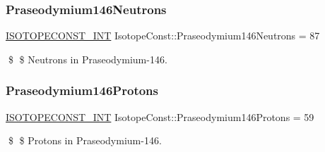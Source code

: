 \subsubsection{\texorpdfstring{Praseodymium146\+Neutrons}{Praseodymium146Neutrons}}
{\footnotesize\ttfamily \mbox{\hyperlink{group___isotope_const-_macros_ga5f18360b3e99483a35c32d789e62621c}{I\+S\+O\+T\+O\+P\+E\+C\+O\+N\+S\+T\+\_\+\+I\+NT}} Isotope\+Const\+::\+Praseodymium146\+Neutrons = 87}

\$ \$ Neutrons in Praseodymium-\/146. \mbox{\label{group___isotope_const-_praseodymium-_pr146_ga41067354d75ed89f2262bab4f9fceeda}} 
\subsubsection{\texorpdfstring{Praseodymium146\+Protons}{Praseodymium146Protons}}
{\footnotesize\ttfamily \mbox{\hyperlink{group___isotope_const-_macros_ga5f18360b3e99483a35c32d789e62621c}{I\+S\+O\+T\+O\+P\+E\+C\+O\+N\+S\+T\+\_\+\+I\+NT}} Isotope\+Const\+::\+Praseodymium146\+Protons = 59}

\$ \$ Protons in Praseodymium-\/146. 